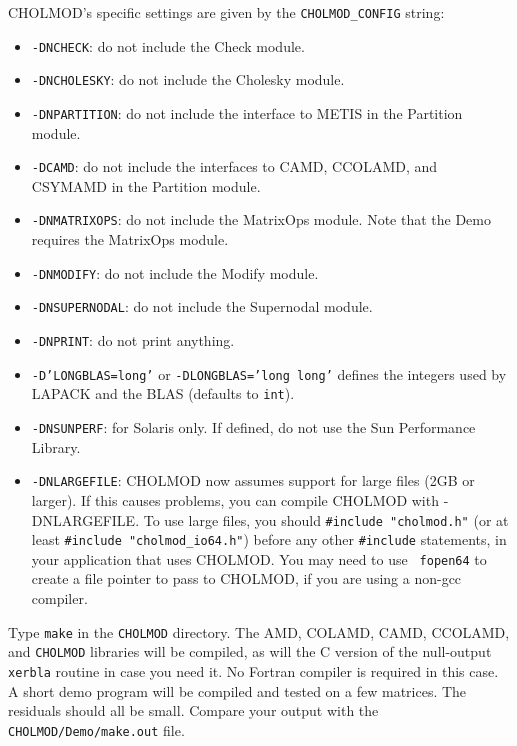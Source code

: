 \documentclass[11pt]{article}
\begin{document}
\noindent
CHOLMOD's specific settings are given by the {\tt CHOLMOD\_CONFIG} string:
\begin{itemize}
\item {\tt -DNCHECK}:	    do not include the Check module.
\item {\tt -DNCHOLESKY}:    do not include the Cholesky module.
\item {\tt -DNPARTITION}:   do not include the interface to METIS in
                            the Partition module.
\item {\tt -DCAMD}:         do not include the interfaces to CAMD, CCOLAMD,
                            and CSYMAMD in the Partition module.
\item {\tt -DNMATRIXOPS}:   do not include the MatrixOps module.
                            Note that the Demo requires the MatrixOps module.
\item {\tt -DNMODIFY}:	    do not include the Modify module.
\item {\tt -DNSUPERNODAL}:  do not include the Supernodal module.
\item {\tt -DNPRINT}:	    do not print anything.
\item {\tt -D'LONGBLAS=long'} or {\tt -DLONGBLAS='long long'}
			    defines the integers used by LAPACK
                            and the BLAS (defaults to {\tt int}).
\item {\tt -DNSUNPERF}:	    for Solaris only.  If defined, do not use the
                            Sun Performance Library.
\item {\tt -DNLARGEFILE}:   CHOLMOD now assumes support for large files (2GB or
                            larger).  If this causes problems, you can compile
                            CHOLMOD with -DNLARGEFILE.  To use large files, you
                            should {\tt \#include "cholmod.h"} (or at least
                            {\tt \#include "cholmod\_io64.h"}) before any other
                            {\tt \#include} statements, in your application
                            that uses CHOLMOD.  You may need to use {\tt
                            fopen64} to create a file pointer to pass to
                            CHOLMOD, if you are using a non-gcc compiler.
\end{itemize}

Type {\tt make} in the {\tt CHOLMOD} directory.  The AMD,
COLAMD, CAMD, CCOLAMD, and {\tt CHOLMOD} libraries will be compiled,
as will the C version of the null-output {\tt xerbla} routine in case you need it.
No Fortran compiler is required in this case.  A short demo program will
be compiled and tested on a few matrices.  The residuals should all be small.
Compare your output with the {\tt CHOLMOD/Demo/make.out} file.
\end{document}
